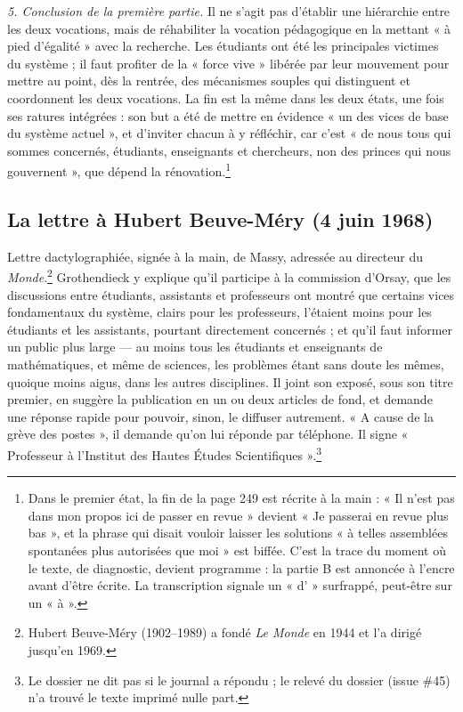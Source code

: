 \documentclass[11pt,a4paper]{article}
\begin{document}
\emph{5. Conclusion de la première partie.} Il ne s'agit pas d'établir une
hiérarchie entre les deux vocations, mais de réhabiliter la vocation
pédagogique en la mettant « à pied d'égalité » avec la recherche. Les étudiants
ont été les principales victimes du système ; il faut profiter de la « force
vive » libérée par leur mouvement pour mettre au point, dès la rentrée, des
mécanismes souples qui distinguent et coordonnent les deux vocations. La fin
est la même dans les deux états, une fois ses ratures intégrées : son but a été
de mettre en évidence « un des vices de base du système actuel », et
d'inviter chacun à y réfléchir, car c'est « de nous tous qui sommes
concernés, étudiants, enseignants et chercheurs, non des princes qui nous
gouvernent », que dépend la rénovation.\footnote{Dans le premier état, la fin
de la page 249 est récrite à la main : « Il n'est pas dans mon propos ici de
passer en revue » devient « Je passerai en revue plus bas », et la phrase qui
disait vouloir laisser les solutions « à telles assemblées spontanées plus
autorisées que moi » est biffée. C'est la trace du moment où le texte, de
diagnostic, devient programme : la partie B est annoncée à l'encre avant
d'être écrite. La transcription signale un « d' » surfrappé, peut-être sur
un « à ».}

\subsection*{La lettre à Hubert Beuve-Méry (4 juin 1968)}

Lettre dactylographiée, signée à la main, de Massy, adressée au directeur du
\emph{Monde}.\footnote{Hubert Beuve-Méry (1902--1989) a fondé \emph{Le
Monde} en 1944 et l'a dirigé jusqu'en 1969.} Grothendieck y explique qu'il
participe à la commission d'Orsay, que les discussions entre étudiants,
assistants et professeurs ont montré que certains vices fondamentaux du
système, clairs pour les professeurs, l'étaient moins pour les étudiants et les
assistants, pourtant directement concernés ; et qu'il faut informer un public
plus large — au moins tous les étudiants et enseignants de mathématiques, et
même de sciences, les problèmes étant sans doute les mêmes, quoique moins
aigus, dans les autres disciplines. Il joint son exposé, sous son titre
premier, en suggère la publication en un ou deux articles de fond, et demande
une réponse rapide pour pouvoir, sinon, le diffuser autrement. « A cause de la
grève des postes », il demande qu'on lui réponde par téléphone. Il signe
« Professeur à l'Institut des Hautes Études Scientifiques ».\footnote{Le
dossier ne dit pas si le journal a répondu ; le relevé du dossier (issue
\#45) n'a trouvé le texte imprimé nulle part.}
\end{document}
